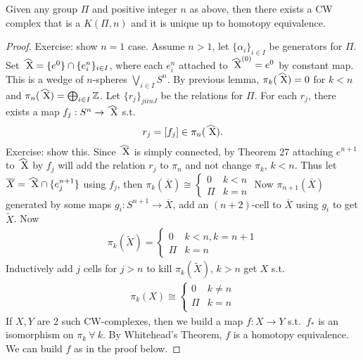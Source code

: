 \documentclass[12pt,class=article,crop=false]{standalone}
\begin{document}
\begin{thm}
Given any group $ \Pi$ and positive integer $ n$ as above, then there exists a CW complex that is a  $ K(\Pi,n)$ and it is unique up to homotopy equivalence.
\end{thm}

\begin{proof}
Exercise: show $ n=1$ case. Assume $ n>1$, let $ \{ \alpha_i\}_{i \in I} $ be generators for $ \Pi$. Set $ \wh{ X} = \{e^{0}\} \cap \{e_i^{n}\}_{i \in I} $, where each $ e_i^{n}$ attached to $ \wh{ X}^{(0)} = e^{0}$ by constant map. This is a wedge of $ n$-spheres $ \bigvee_{i \in I} S^{n}$. By previous lemma, $ \pi_k(\wh{ X}) = 0$ for $ k<n$ and  $ \pi_n(\wh{ X}) = \bigoplus_{ i \in I} \zz$. Let $ \{r_j\}_{j iin J} $ be the relations for $ \Pi$. For each $ r_j$, there exists a map $ f_j: S^{n} \to \wh{ X}$ s.t.\ 
 \begin{align*}
	 r_j = [f_j] \in \pi_n(\wh{ X}).
\end{align*}
Exercise: show this. Since $ \wh{ X}$ is simply connected, by Theorem 27 attaching $ e^{n+1}$ to $ \wh{ X}$ by $ f_j$ will add the relation $ r_j$ to $ \pi_n$ and not change $ \pi_k$, $ k<n$. Thus let $ \overline{X} = \wh{ X} \cap \{e_j^{n+1}\} $ using $ f_j$, then $ \pi_k(\overline{X}) \cong \begin{cases}
	0 & k<n\\
	\Pi & k=n
\end{cases}$
Now $ \pi_{n+1}(\overline{X})$ generated by some maps $ g_i: S^{n+1} \to \overline{X}$, add an $ (n+2)$-cell to  $ \overline{X}$ using $ g_i$ to get $ \widetilde{ X}$. Now
\begin{align*}
	\pi_k(\widetilde{ X}) = \begin{cases}
		0 & k<n,k=n+1\\
		\Pi& k=n
	\end{cases}
\end{align*}
Inductively add $ j$ cells for  $ j>n$ to kill  $ \pi_k(\widetilde{ X})$, $ k>n$ get  $ X$  s.t.\ 
\begin{align*}
	\pi_k(X) \cong \begin{cases}
		0 & k \neq n\\
		\Pi& k=n\\
	\end{cases}
\end{align*}
If $ X,Y$ are 2 such CW-complexes, then we build a map  $ f: X \to Y$ s.t.\ $ f_*$ is an isomorphism on  $ \pi_k \ \forall \ k$. By Whitehead's Theorem, $ f$ is a homotopy equivalence. We can build  $ f$ as in the proof below.
\end{proof}
\end{document}
